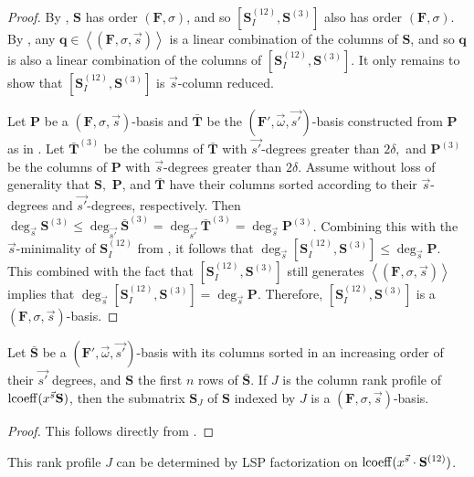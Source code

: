 \begin{proof}
By , $\mathbf{S}$ has order $\left(\mathbf{F},\sigma\right)$,
and so $[\mathbf{S}_{I}^{\left(12\right)},\mathbf{S}^{\left(3\right)}]$
also has order $\left(\mathbf{F},\sigma\right)$. By ,
any $\mathbf{q}\in\left\langle \left(\mathbf{F},\sigma,\vec{s}\right)\right\rangle $
is a linear combination of the columns of $\mathbf{S}$, and so $\mathbf{q}$
is also a linear combination of the columns of $[\mathbf{S}_{I}^{\left(12\right)},\mathbf{S}^{\left(3\right)}]$.
It only remains to show that $[\mathbf{S}_{I}^{\left(12\right)},\mathbf{S}^{\left(3\right)}]$
is $\vec{s}$-column reduced.

Let $\mathbf{P}$ be a $\left(\mathbf{F},\sigma,\vec{s}\right)$-basis
and $\mathbf{\bar{\mathbf{T}}}$ be the $(\mathbf{F}',\vec{\omega},\vec{s'})$-basis
constructed from $\mathbf{P}$ as in . Let
$\bar{\mathbf{T}}^{\left(3\right)}$ be the columns of $\bar{\mathbf{T}}$
with $\vec{s'}$-degrees greater than $2\delta,$ and $\mathbf{P}^{\left(3\right)}$
be the columns of $\mathbf{P}$ with $\vec{s}$-degrees greater than
$2\delta.$ Assume without loss of generality that $\mathbf{S},$
$\mathbf{P}$, and $\bar{\mathbf{T}}$ have their columns sorted according
to their $\vec{s}$-degrees and $\vec{s'}$-degrees, respectively.
Then $\deg_{\vec{s}}\mathbf{S}^{\left(3\right)}\le\deg_{\vec{s'}}\bar{\mathbf{S}}^{\left(3\right)}=\deg_{\vec{s'}}\bar{\mathbf{T}}^{\left(3\right)}=\deg_{\vec{s}}\mathbf{P}^{\left(3\right)}$.
Combining this with the $\vec{s}$-minimality of $\mathbf{S}_{I}^{\left(12\right)}$
from , it follows that $\deg_{\vec{s}}[\mathbf{S}_{I}^{\left(12\right)},\mathbf{S}^{\left(3\right)}]\le\deg_{\vec{s}}\mathbf{P}$.
This combined with the fact that $[\mathbf{S}_{I}^{\left(12\right)},\mathbf{S}^{\left(3\right)}]$
still generates $\left\langle \left(\mathbf{F},\sigma,\vec{s}\right)\right\rangle $
implies that $\deg_{\vec{s}}[\mathbf{S}_{I}^{\left(12\right)},\mathbf{S}^{\left(3\right)}]=\deg_{\vec{s}}\mathbf{P}$.
Therefore, $[\mathbf{S}_{I}^{\left(12\right)},\mathbf{S}^{\left(3\right)}]$
is a $\left(\mathbf{F},\sigma,\vec{s}\right)$-basis. \end{proof}
\begin{cor}
\label{cor:extractingFbasisFromGbasis}Let $\bar{\mathbf{S}}$ be
a $(\mathbf{F}',\vec{\omega},\vec{s'})$-basis with its columns sorted
in an increasing order of their $\vec{s'}$ degrees, and $\mathbf{S}$
the first $n$ rows of $\bar{\mathbf{S}}$. If $J$ is the column
rank profile of $\operatorname{lcoeff}(x^{\vec{s}}\mathbf{S})$, then the submatrix
$\mathbf{S}_{J}$ of $\mathbf{S}$ indexed by $J$ is a $\left(\mathbf{F},\sigma,\vec{s}\right)$-basis.\end{cor}
\begin{proof}
This follows directly from . 
\end{proof}
This rank profile $J$ can be determined by LSP factorization on $\operatorname{lcoeff}(x^{\vec{s}}\cdot\mathbf{S}^{\left(12\right)})$.

